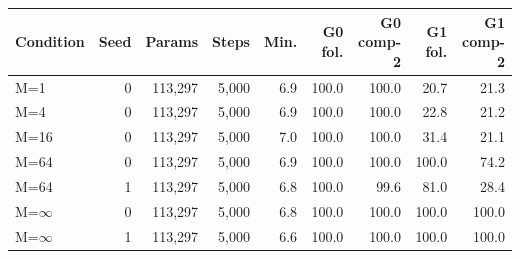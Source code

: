 \begin{tabular}{@{}lrrrrrrrr@{}}
\toprule
Condition & Seed & Params & Steps & Min. & G0 fol. & G0 comp-2 & G1 fol. & G1 comp-2 \\
\midrule
M=1 & 0 & 113{,}297 & 5{,}000 & 6.9 & 100.0 & 100.0 & 20.7 & 21.3 \\
M=4 & 0 & 113{,}297 & 5{,}000 & 6.9 & 100.0 & 100.0 & 22.8 & 21.2 \\
M=16 & 0 & 113{,}297 & 5{,}000 & 7.0 & 100.0 & 100.0 & 31.4 & 21.1 \\
M=64 & 0 & 113{,}297 & 5{,}000 & 6.9 & 100.0 & 100.0 & 100.0 & 74.2 \\
M=64 & 1 & 113{,}297 & 5{,}000 & 6.8 & 100.0 & 99.6 & 81.0 & 28.4 \\
M=$\infty$ & 0 & 113{,}297 & 5{,}000 & 6.8 & 100.0 & 100.0 & 100.0 & 100.0 \\
M=$\infty$ & 1 & 113{,}297 & 5{,}000 & 6.6 & 100.0 & 100.0 & 100.0 & 100.0 \\
\bottomrule
\end{tabular}
